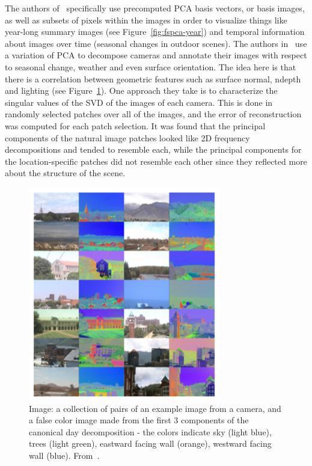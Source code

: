 \documentclass[11pt]{article}
\begin{document}
The authors of~\cite{fspca} specifically use precomputed PCA basis vectors, or basis images, as well as subsets of pixels within the images in order to visualize things like year-long summary images (see Figure~\ref{fig:fspca-year}) and temporal information about images over time (seasonal changes in outdoor scenes). The authors in~\cite{many-outdoor-scenes} use a variation of PCA to decompose cameras and annotate their images with respect to seasonal change, weather and even surface orientation. The idea here is that there is a correlation between geometric features such as surface normal, ndepth and lighting (see Figure~\ref{fig:amos}). One approach they take is to characterize the singular values of the SVD of the images of each camera. This is done in randomly selected patches over all of the images, and the error of reconstruction was computed for each patch selection. It was found that the principal components of the natural image patches looked like 2D frequency decompositions and tended to resemble each, while the principal components for the location-specific patches did not resemble each other since they reflected more about the structure of the scene. 

\begin{figure}[t]
\includegraphics[scale=0.55]{amos-pca}
\centering
\caption{Image: a collection of pairs of an example image from a camera, and a false color image made from the first 3 components of the canonical day decomposition - the colors indicate sky (light blue), trees (light green), eastward facing wall (orange), westward facing wall (blue). From~\cite{many-outdoor-scenes}.}
\label{fig:amos}
\end{figure}
\end{document}
